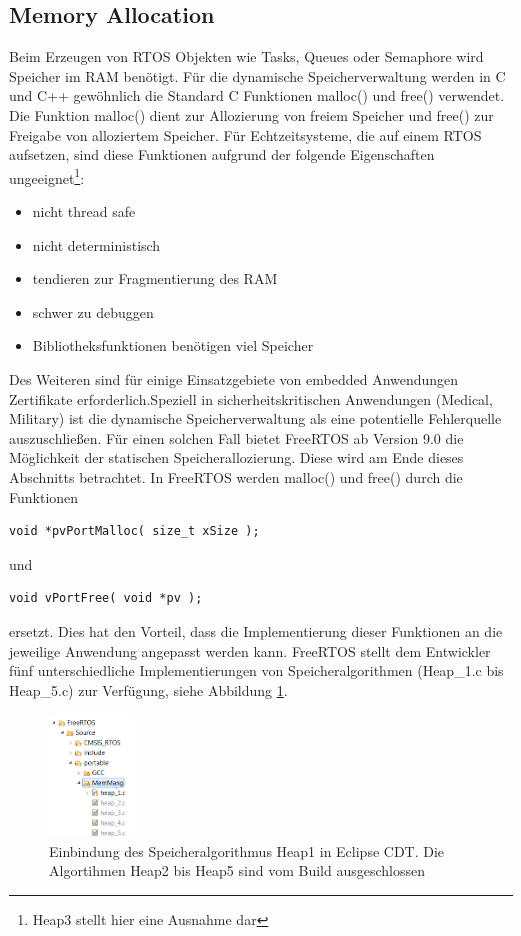 \subsection{Memory Allocation}
Beim Erzeugen von RTOS Objekten wie Tasks, Queues oder Semaphore wird Speicher im RAM benötigt. Für die dynamische Speicherverwaltung werden in C und C++ ge\-wöhnlich die Standard C Funktionen malloc() und free() verwendet. Die Funktion malloc() dient zur Allozierung von freiem Speicher und free() zur Freigabe von alloziertem Speicher. Für Echtzeitsysteme, die auf einem RTOS aufsetzen, sind diese Funktionen aufgrund der folgende Eigenschaften\cite{MasteringFreeRtos} ungeeignet\footnote{Heap3 stellt hier eine Ausnahme dar}:
\begin{itemize}
	\item nicht thread safe
	\item nicht deterministisch
	\item tendieren zur Fragmentierung des RAM
	\item schwer zu debuggen
	\item Bibliotheksfunktionen benötigen viel Speicher
\end{itemize}
Des Weiteren sind für einige Einsatzgebiete von embedded Anwendungen Zertifikate erforderlich.\newline Speziell in sicherheitskritischen Anwendungen (Medical, Military) ist die dynamische Speicherverwaltung als eine potentielle Fehlerquelle auszuschließen. Für einen solchen Fall bietet FreeRTOS ab Version 9.0 die Möglichkeit der statischen Speicherallozierung. Diese wird am Ende dieses Abschnitts betrachtet. In FreeRTOS werden malloc() und free() durch die Funktionen  
\begin{lstlisting}[label=lst:vPortMalloc1, numbers = none]
void *pvPortMalloc( size_t xSize );
\end{lstlisting}
und
\begin{lstlisting}[label=lst:vPortFree1, numbers = none]
void vPortFree( void *pv );
\end{lstlisting}
ersetzt. Dies hat den Vorteil, dass die Implementierung dieser Funktionen an die jeweilige Anwendung angepasst werden kann. FreeRTOS stellt dem Entwickler fünf unterschiedliche Implementierungen von Speicheralgorithmen (Heap\_1.c bis Heap\_5.c) zur Verfügung, siehe Abbildung \ref{fig:HeapsEclipse}. 
\begin{figure}[htb]
	\centering
		\includegraphics[width=0.2\textwidth]{Pictures/Eclipse/Heaps.png}
	\caption{Einbindung des Speicheralgorithmus Heap1 in Eclipse CDT. Die Algortihmen Heap2 bis Heap5 sind vom Build ausgeschlossen}
	\label{fig:HeapsEclipse}
\end{figure}
